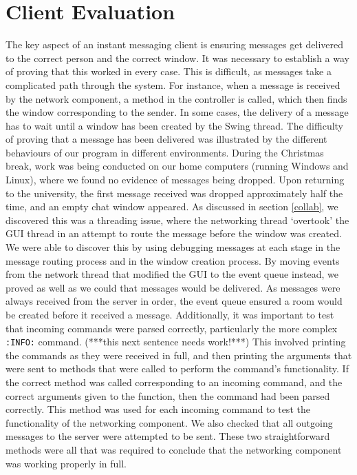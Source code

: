 \section{Client Evaluation}
\label{client_eval}

The key aspect of an instant messaging client is ensuring messages get delivered to the correct person and the correct window. It was necessary to establish a way of proving that this worked in every case. This is difficult, as messages take a complicated path through the system. For instance, when a message is received by the network component, a method in the controller is called, which then finds the window corresponding to the sender. In some cases, the delivery of a message has to wait until a window has been created by the Swing thread. The difficulty of proving that a message has been delivered was illustrated by the different behaviours of our program in different environments. During the Christmas break, work was being conducted on our home computers (running Windows and Linux), where we found no evidence of messages being dropped. Upon returning to the university, the first message received was dropped approximately half the time, and an empty chat window appeared. As discussed in section \ref{collab}, we discovered this was a threading issue, where the networking thread `overtook' the GUI thread in an attempt to route the message before the window was created. We were able to discover this by using debugging messages at each stage in the message routing process and in the window creation process. By moving events from the network thread that modified the GUI to the event queue instead, we proved as well as we could that messages would be delivered. As messages were always received from the server in order, the event queue ensured a room would be created before it received a message. 
Additionally, it was important to test that incoming commands were parsed correctly, particularly the more complex \texttt{:INFO:} command. (***this next sentence needs work!***) This involved printing the commands as they were received in full, and then printing the arguments that were sent to methods that were called to perform the command's functionality. If the correct method was called corresponding to an incoming command, and the correct arguments given to the function, then the command had been parsed correctly. This method was used for each incoming command to test the functionality of the networking component. We also checked that all outgoing messages to the server were attempted to be sent. These two straightforward methods were all that was required to conclude that the networking component was working properly in full.

